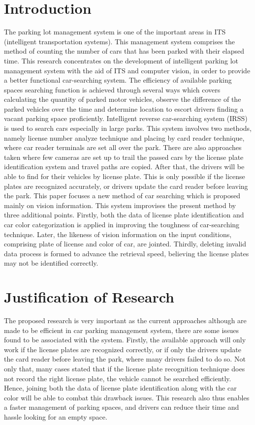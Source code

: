 \documentclass[12pt]{article}
\begin{document}
\section{Introduction}
The parking lot management system is one of the important areas in ITS (intelligent transportation systems). This management system comprises the method of counting the number of cars that has been parked with their elapsed time. This research concentrates on the development of intelligent parking lot management system with the aid of ITS and computer vision, in order to provide a better functional car-searching system. 
The efficiency of available parking spaces searching function is achieved through several ways which covers calculating the quantity of parked motor vehicles, observe the difference of the parked vehicles over the time and determine location to escort drivers finding a vacant parking space proficiently. Intelligent reverse car-searching system (IRSS) is used to search cars especially in large parks. This system involves two methods, namely license number analyze technique and placing by card reader technique, where car reader terminals are set all over the park. There are also approaches taken where few cameras are set up to trail the passed cars by the license plate identification system and travel paths are copied. After that, the drivers will be able to find for their vehicles by license plate. This is only possible if the license plates are recognized accurately, or drivers update the card reader before leaving the park. 
This paper focuses a new method of car searching which is proposed mainly on vision information. This system improvises the present method by three additional points. Firstly, both the data of license plate identification and car color categorization is applied in improving the toughness of car-searching technique. Later, the likeness of vision information on the input conditions, comprising plate of license and color of car, are jointed. Thirdly, deleting invalid data process is formed to advance the retrieval speed, believing the license plates may not be identified correctly. 

\section{Justification of Research}
The proposed research is very important as the current approaches although are made to be efficient in car parking management system, there are some issues found to be associated with the system.  Firstly, the available approach will only work if the license plates are recognized correctly, or if only the drivers update the card reader before leaving the park, where many drivers failed to do so. Not only that, many cases stated that if the license plate recognition technique does not record the right license plate, the vehicle cannot be searched efficiently. Hence, joining both the data of license plate identification along with the car color will be able to combat this drawback issues. This research also thus enables a faster management of parking spaces, and drivers can reduce their time and hassle looking for an empty space. 
\end{document}

